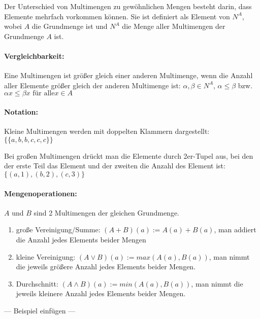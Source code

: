 Der Unterschied von Multimengen zu gewöhnlichen Mengen besteht darin,
dass Elemente mehrfach vorkommen können. Sie ist definiert als Element
von $N^A$, wobei $A$ die Grundmenge ist und $N^A$ die Menge aller
Multimengen der Grundmenge $A$ ist.

\paragraph{Vergleichbarkeit:} Eine Multimengen ist größer gleich einer anderen Multimenge, wenn die
Anzahl aller Elemente größer gleich der anderen Multimenge ist:
$\alpha, \beta \in N^A$, $\alpha \le \beta$ bzw. $\alpha x \le \beta x \text{ für alle
} x \in A$

\paragraph{Notation:} Kleine Multimengen werden mit doppelten
Klammern dargestellt: $\{\{a,b,b,c,c,c\}\}$

Bei großen Multimengen drückt man die Elemente durch 2er-Tupel aus, bei
den der erste Teil das Element und der zweiten die Anzahl des Element
ist: $\{(a,1),(b,2),(c,3)\}$


\paragraph{Mengenoperationen:}
$A$ und $B$ sind 2 Multimengen der gleichen Grundmenge.
\begin{enumerate}
\item große Vereinigung/Summe: $(A + B)(a) := A(a) + B(a)$, man
  addiert die Anzahl jedes Elements beider Mengen
\item kleine Vereinigung: $(A \vee B)(a) := max(A(a), B(a))$, man
  nimmt die jeweils größere Anzahl jedes Elements beider Mengen.
\item Durchschnitt: $(A \wedge B)(a) := min(A(a), B(a))$, man nimmt die
  jeweils kleinere Anzahl jedes Elements beider Mengen.
\end{enumerate}

--- Beispiel einfügen ---

